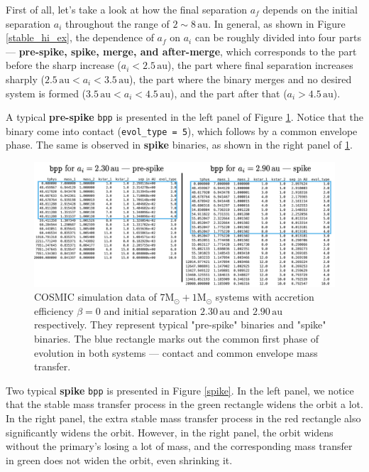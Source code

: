 \documentclass[12pt]{article}
\newcommand{\Msun}{\mathrm{M_{\odot}}}
\newcommand{\au}{\, \mathrm{au}}
\begin{document}
First of all, let's take a look at how the final separation $a_f$ depends on the initial separation $a_i$ throughout the range of $2 \sim 8 \au$. In general, as shown in Figure \ref{stable_hi_ex}, the dependence of $a_f$ on $a_i$ can be roughly divided into four parts — \textbf{pre-spike, spike, merge, and after-merge}, which corresponds to the part before the sharp increase ($a_i < 2.5 \au$), the part where final separation increases sharply ($2.5 \au < a_i < 3.5 \au$), the part where the binary merges and no desired system is formed ($3.5 \au < a_i < 4.5 \au$), and the part after that ($a_i > 4.5 \au$).

A typical \textbf{pre-spike} \verb|bpp| is presented in the left panel of Figure \ref{pre-spike-spike}. Notice that the binary come into contact (\verb|evol_type = 5|), which follows by a common envelope phase. The same is observed in \textbf{spike} binaries, as shown in the right panel of \ref{pre-spike-spike}.

\begin{figure}
    \centering
    \includegraphics[width=\linewidth]{fig/pre-spike-spike.png}
    \caption{COSMIC simulation data of $7 \Msun + 1 \Msun$ systems with accretion efficiency $\beta = 0$ and initial separation $2.30 \au$ and $2.90 \au$ respectively. They represent typical "pre-spike" binaries and "spike" binaries. The blue rectangle marks out the common first phase of evolution in both systems — contact and common envelope mass transfer.}
    \label{pre-spike-spike}
\end{figure}

Two typical \textbf{spike} \verb|bpp| is presented in Figure \ref{spike}. In the left panel, we notice that the stable mass transfer process in the green rectangle widens the orbit a lot. In the right panel, the extra stable mass transfer process in the red rectangle also significantly widens the orbit. However, in the right panel, the orbit widens without the primary's losing a lot of mass, and the corresponding mass transfer in green does not widen the orbit, even shrinking it.
\end{document}
